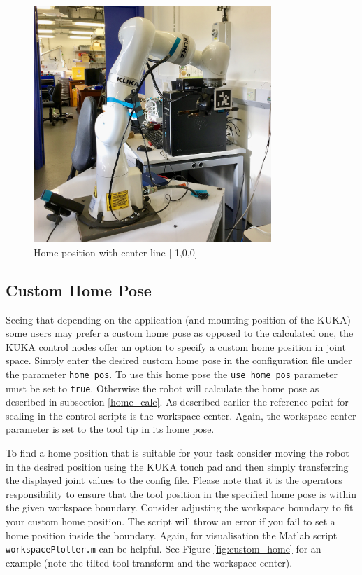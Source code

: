 \documentclass[headsepline,footinclude=false,fontsize=11pt,paper=a4,listof=totoc,bibliography=totoc,BCOR=12mm,DIV=14]{scrbook}
\begin{document}
\begin{figure}[h!]
    \centering
    \includegraphics[width=9cm]{figures/case_2}
    \caption{Home position with center line [-1,0,0]}
    \label{case_2}
\end{figure}


\newpage
\subsection{Custom Home Pose}

Seeing that depending on the application (and mounting position of the KUKA) some users may prefer a custom home pose as opposed to the calculated one, the KUKA control nodes offer an option to specify a custom home position in joint space. Simply enter the desired custom home pose in the configuration file under the parameter \texttt{home\_pos}. To use this home pose the \texttt{use\_home\_pos} parameter must be set to \texttt{true}. Otherwise the robot will calculate the home pose as described in subsection \ref{home_calc}. As described earlier the reference point for scaling in the control scripts is the workspace center. Again, the workspace center parameter is set to the tool tip in its home pose.

To find a home position that is suitable for your task consider moving the robot in the desired position using the KUKA touch pad and then simply transferring the displayed joint values to the config file. Please note that it is the operators responsibility to ensure that the tool position in the specified home pose is within the given workspace boundary. Consider adjusting the workspace boundary to fit your custom home position. The script will throw an error if you fail to set a home position inside the boundary. Again, for visualisation the Matlab script \texttt{workspacePlotter.m} can be helpful. See Figure \ref{fig:custom_home} for an example (note the tilted tool transform and the workspace center). 
\end{document}
